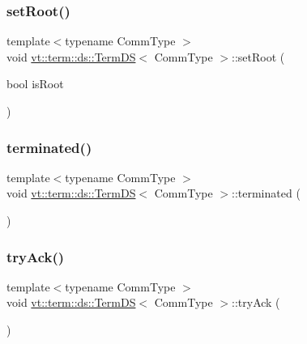 \subsubsection{\texorpdfstring{set\+Root()}{setRoot()}}
{\footnotesize\ttfamily template$<$typename Comm\+Type $>$ \\
void \hyperlink{structvt_1_1term_1_1ds_1_1_term_d_s}{vt\+::term\+::ds\+::\+Term\+DS}$<$ Comm\+Type $>$\+::set\+Root (\begin{DoxyParamCaption}\item[{bool}]{is\+Root }\end{DoxyParamCaption})}

\mbox{\label{structvt_1_1term_1_1ds_1_1_term_d_s_acf4896eceb679d2ee46f5cc0ff1420e3}} 
\subsubsection{\texorpdfstring{terminated()}{terminated()}}
{\footnotesize\ttfamily template$<$typename Comm\+Type $>$ \\
void \hyperlink{structvt_1_1term_1_1ds_1_1_term_d_s}{vt\+::term\+::ds\+::\+Term\+DS}$<$ Comm\+Type $>$\+::terminated (\begin{DoxyParamCaption}{ }\end{DoxyParamCaption})}

\mbox{\label{structvt_1_1term_1_1ds_1_1_term_d_s_ad5693df663610dc8003d37c5c505b9f4}} 
\subsubsection{\texorpdfstring{try\+Ack()}{tryAck()}}
{\footnotesize\ttfamily template$<$typename Comm\+Type $>$ \\
void \hyperlink{structvt_1_1term_1_1ds_1_1_term_d_s}{vt\+::term\+::ds\+::\+Term\+DS}$<$ Comm\+Type $>$\+::try\+Ack (\begin{DoxyParamCaption}{ }\end{DoxyParamCaption})}

